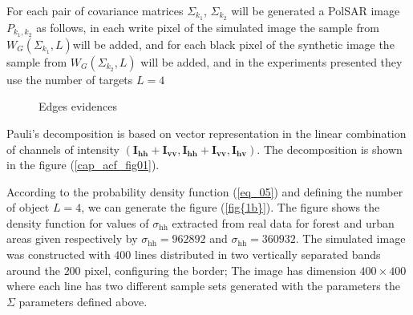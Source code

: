 \documentclass[conference]{IEEEtran}
\begin{document}
For each pair of covariance matrices $\Sigma_{k_1}$, $\Sigma_{k_2}$ will be generated a PolSAR image $P_{k_1,k_2}$ as follows, in each write pixel of the simulated image the sample from  $W_G(\Sigma_{k_1}, L)$will be added,  and for each black pixel of the synthetic image the sample from $W_G(\Sigma_{k_2},L)$ will be added, and in the experiments presented they use the number of targets $L=4$
\begin{figure}[!ht]
     \hfill
    \caption{Edges evidences}
     \label{fig_01}
\end{figure}

Pauli's decomposition is based on vector representation in the linear combination of channels of intensity $(\mathbf{I_\text{hh}+I_{\text{vv}}}, \mathbf{I_\text{hh}+I_{\text{vv}}}, \mathbf{I_\text{hv}})$. The decomposition is shown in the figure (\ref{cap_acf_fig01}). 

According to the probability density function (\ref{eq_05}) and defining the number of object $L=4$, we can generate the figure (\ref{fig{1b}}). The figure shows the density function for values of $\sigma_\text{hh}$ extracted from real data for forest and urban areas given respectively by $\sigma_\text{hh}=962892$ and $\sigma_\text{hh}= 360932$. 
%
The simulated image was constructed with $400$ lines distributed in two vertically separated bands around the $200$ pixel, configuring the border; The image has dimension $400 \times 400$ where each line has two different sample sets generated with the parameters the $\Sigma$ parameters defined above.  
\end{document}
